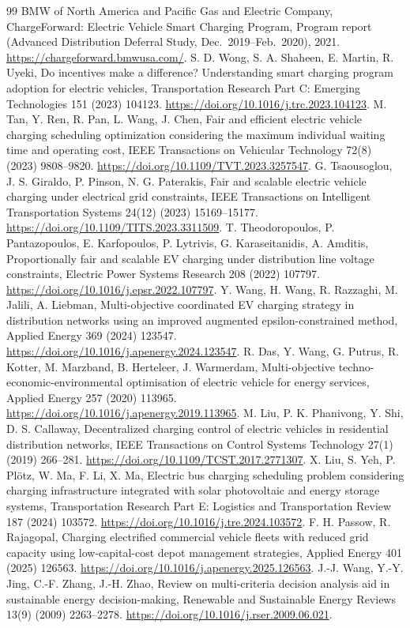 \documentclass[12pt]{article}
\begin{document}
\begin{thebibliography}{99}
 BMW of North America and Pacific Gas and Electric Company, {ChargeForward}: Electric Vehicle Smart Charging Program, Program report (Advanced Distribution Deferral Study, Dec.\ 2019--Feb.\ 2020), 2021. \url{https://chargeforward.bmwusa.com/}.
 S. D. Wong, S. A. Shaheen, E. Martin, R. Uyeki, Do incentives make a difference? Understanding smart charging program adoption for electric vehicles, Transportation Research Part C: Emerging Technologies 151 (2023) 104123. \url{https://doi.org/10.1016/j.trc.2023.104123}.
 M. Tan, Y. Ren, R. Pan, L. Wang, J. Chen, Fair and efficient electric vehicle charging scheduling optimization considering the maximum individual waiting time and operating cost, IEEE Transactions on Vehicular Technology 72(8) (2023) 9808--9820. \url{https://doi.org/10.1109/TVT.2023.3257547}.
 G. Tsaousoglou, J. S. Giraldo, P. Pinson, N. G. Paterakis, Fair and scalable electric vehicle charging under electrical grid constraints, IEEE Transactions on Intelligent Transportation Systems 24(12) (2023) 15169--15177. \url{https://doi.org/10.1109/TITS.2023.3311509}.
 T. Theodoropoulos, P. Pantazopoulos, E. Karfopoulos, P. Lytrivis, G. Karaseitanidis, A. Amditis, Proportionally fair and scalable EV charging under distribution line voltage constraints, Electric Power Systems Research 208 (2022) 107797. \url{https://doi.org/10.1016/j.epsr.2022.107797}.
 Y. Wang, H. Wang, R. Razzaghi, M. Jalili, A. Liebman, Multi-objective coordinated EV charging strategy in distribution networks using an improved augmented epsilon-constrained method, Applied Energy 369 (2024) 123547. \url{https://doi.org/10.1016/j.apenergy.2024.123547}.
 R. Das, Y. Wang, G. Putrus, R. Kotter, M. Marzband, B. Herteleer, J. Warmerdam, Multi-objective techno-economic-environmental optimisation of electric vehicle for energy services, Applied Energy 257 (2020) 113965. \url{https://doi.org/10.1016/j.apenergy.2019.113965}.
 M. Liu, P. K. Phanivong, Y. Shi, D. S. Callaway, Decentralized charging control of electric vehicles in residential distribution networks, IEEE Transactions on Control Systems Technology 27(1) (2019) 266--281. \url{https://doi.org/10.1109/TCST.2017.2771307}.
 X. Liu, S. Yeh, P. Pl\"otz, W. Ma, F. Li, X. Ma, Electric bus charging scheduling problem considering charging infrastructure integrated with solar photovoltaic and energy storage systems, Transportation Research Part E: Logistics and Transportation Review 187 (2024) 103572. \url{https://doi.org/10.1016/j.tre.2024.103572}.
 F. H. Passow, R. Rajagopal, Charging electrified commercial vehicle fleets with reduced grid capacity using low-capital-cost depot management strategies, Applied Energy 401 (2025) 126563. \url{https://doi.org/10.1016/j.apenergy.2025.126563}.
 J.-J. Wang, Y.-Y. Jing, C.-F. Zhang, J.-H. Zhao, Review on multi-criteria decision analysis aid in sustainable energy decision-making, Renewable and Sustainable Energy Reviews 13(9) (2009) 2263--2278. \url{https://doi.org/10.1016/j.rser.2009.06.021}.


\end{thebibliography}
\end{document}
